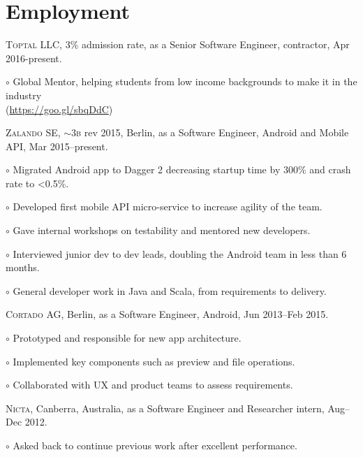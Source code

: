\documentclass[letterpaper]{article}
\renewenvironment{itemize}{
  \begin{list}{}{
    \setlength{\leftmargin}{1.5em}
  }
}{
  \end{list}
}
\newenvironment{no-indent-itemize}{
  \begin{list}{}{
    \setlength{\leftmargin}{0em}
  }
}{
  \end{list}
}
\def\tilde{$\scriptstyle\sim$}
\def\bullet{$\circ$\xspace}
\begin{document}
\section*{Employment}
\begin{no-indent-itemize}
  \item \textsc{Toptal LLC}, 3\% admission rate, as a Senior Software Engineer, contractor, Apr 2016-present.
  \begin{itemize}
    \item\bullet Global Mentor, helping students from low income backgrounds to make it in the industry \\  
    \phantom{\bullet }(\href{https://goo.gl/sbqDdC}{https://goo.gl/sbqDdC})
  \end{itemize}
  \item \textsc{Zalando SE}, \tilde 3\textsc{b} rev 2015, Berlin, as a Software Engineer, 
         Android and Mobile API, Mar 2015--present. 
  \begin{itemize}
	\item\bullet Migrated Android app to Dagger 2 decreasing startup time by 300\% and crash rate to <0.5\%.
	\item\bullet Developed first mobile API micro-service to increase agility of the team.
	\item\bullet Gave internal workshops on testability and mentored new developers.
	\item\bullet Interviewed junior dev to dev leads, doubling the Android team in less than 6 months.	
	\item\bullet General developer work in Java and Scala, from requirements to delivery.
  \end{itemize}
  \item \textsc{Cortado AG}, Berlin, as a Software Engineer, Android, Jun 2013--Feb 2015.
  \begin{itemize}
     \item\bullet Prototyped and responsible for new app architecture.
     \item\bullet Implemented key components such as preview and file operations.
     \item\bullet Collaborated with UX and product teams to assess requirements.
  \end{itemize}
  \item \textsc{Nicta}, Canberra, Australia, as a Software Engineer and Researcher intern, Aug--Dec 2012. 
  \begin{itemize}
	 \item\bullet Asked back to continue previous work after excellent performance.

\end{itemize}
\end{no-indent-itemize}
\end{document}
